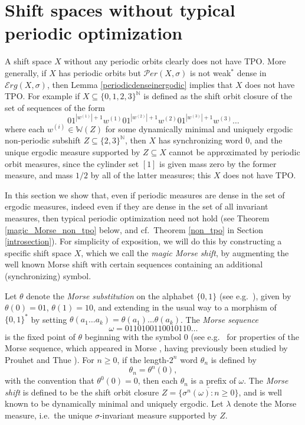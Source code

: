 \documentclass[reqno,11pt]{amsart}
\theoremstyle{definition}
\theoremstyle{remark}
\theoremstyle{remark}
\def \N {\mathbb N}
\def\per{{\mathcal{P}er}}
\def\e{\mathcal{E}rg}
\def\w{\mathbb{W}}
\numberwithin{equation}{section}
\begin{document}
\section{Shift spaces without typical periodic optimization}\label{magicmorsesection}


A shift space $X$ without any periodic orbits clearly does not have TPO.
More generally, 
if $X$  has 
periodic orbits but
$\per(X,\sigma)$ is not weak$^*$ dense in $\e(X,\sigma)$, then
Lemma \ref{periodicdenseinergodic} implies that $X$ does not have TPO.
For example if $X\subseteq\{0,1,2,3\}^\N$ is defined as the shift orbit closure of
the set of sequences
of the form 
$$01^{|w^{(1)}|+1}w^{(1)} 01^{|w^{(2)}|+1}w^{(2)} 01^{|w^{(3)}|+1}w^{(3)}\ldots$$
where each $w^{(i)}\in\w(Z)$ for some 
dynamically minimal and uniquely ergodic
non-periodic subshift $Z\subseteq\{2,3\}^\N$,
then $X$ has  
synchronizing word 
0, and the unique ergodic measure supported by $Z\subseteq X$
cannot be approximated by periodic orbit measures, since the cylinder set $[1]$ is given mass zero by the former measure, and mass $1/2$ by all of the latter measures; this $X$ does not have TPO.

In this section we show that, even if
periodic measures are dense in the set of ergodic measures, 
indeed even if they are dense in the set of all invariant measures,
then typical periodic optimization need not hold
(see Theorem \ref{magic_Morse_non_tpo} below, and cf.~Theorem \ref{non_tpo} in Section \ref{introsection}).
For simplicity of exposition, we will do this by constructing a specific shift space $X$,
which we call the \emph{magic Morse shift}, by augmenting the well known Morse shift 
with certain sequences containing an additional (synchronizing) symbol.


Let $\theta$ denote the \emph{Morse substitution} on the alphabet $\{0,1\}$ (see e.g.~\cite[p.~7]{pytheasfogg}), given by $\theta(0)=01$, $\theta(1)=10$,
and extending in the usual way to a morphism of $\{0,1\}^*$ by setting $\theta(a_1\ldots a_k)= \theta(a_1)\ldots\theta(a_k)$.
The \emph{Morse sequence} 
$$\omega
= 0110100110010110\ldots$$
is the fixed point of $\theta$ beginning with the symbol 0
(see e.g.~\cite{pytheasfogg} for properties of the Morse sequence, which appeared in
Morse \cite{morse}, having previously been studied by Prouhet \cite{prouhet} and Thue \cite{thue}).
For $n\ge0$, if the length-$2^n$ word $\theta_n$ is defined by
$$\theta_n=\theta^n(0),$$
with the convention that $\theta^0(0)=0$, then each $\theta_n$ is a prefix of $\omega$.
The \emph{Morse shift} is defined to be the shift orbit closure $Z=\overline{\{\sigma^n(\omega) : n\ge 0\}}$,
and is well known
to be dynamically minimal and uniquely ergodic.
Let $\lambda$ denote the Morse measure, i.e.~the unique $\sigma$-invariant measure supported by $Z$.
\end{document}
